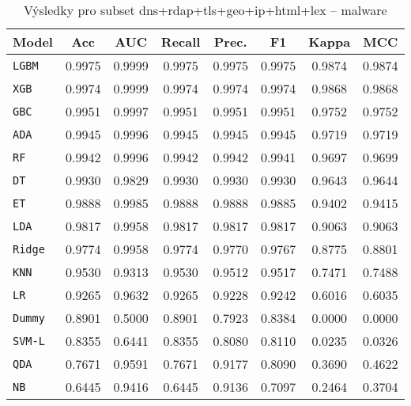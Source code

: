 \begin{table}[H]
  \centering
  \small
  \caption{Výsledky pro subset dns+rdap+tls+geo+ip+html+lex – malware}
  \begin{tabular}{|l|c|c|c|c|c|c|c|}
    \hline
    \textbf{Model} & \textbf{Acc} & \textbf{AUC} & \textbf{Recall} & \textbf{Prec.} & \textbf{F1} & \textbf{Kappa} & \textbf{MCC} \\
    \hline
    \texttt{LGBM} & 0.9975 & 0.9999 & 0.9975 & 0.9975 & 0.9975 & 0.9874 & 0.9874 \\
    \texttt{XGB} & 0.9974 & 0.9999 & 0.9974 & 0.9974 & 0.9974 & 0.9868 & 0.9868 \\
    \texttt{GBC} & 0.9951 & 0.9997 & 0.9951 & 0.9951 & 0.9951 & 0.9752 & 0.9752 \\
    \texttt{ADA} & 0.9945 & 0.9996 & 0.9945 & 0.9945 & 0.9945 & 0.9719 & 0.9719 \\
    \texttt{RF} & 0.9942 & 0.9996 & 0.9942 & 0.9942 & 0.9941 & 0.9697 & 0.9699 \\
    \texttt{DT} & 0.9930 & 0.9829 & 0.9930 & 0.9930 & 0.9930 & 0.9643 & 0.9644 \\
    \texttt{ET} & 0.9888 & 0.9985 & 0.9888 & 0.9888 & 0.9885 & 0.9402 & 0.9415 \\
    \texttt{LDA} & 0.9817 & 0.9958 & 0.9817 & 0.9817 & 0.9817 & 0.9063 & 0.9063 \\
    \texttt{Ridge} & 0.9774 & 0.9958 & 0.9774 & 0.9770 & 0.9767 & 0.8775 & 0.8801 \\
    \texttt{KNN} & 0.9530 & 0.9313 & 0.9530 & 0.9512 & 0.9517 & 0.7471 & 0.7488 \\
    \texttt{LR} & 0.9265 & 0.9632 & 0.9265 & 0.9228 & 0.9242 & 0.6016 & 0.6035 \\
    \texttt{Dummy} & 0.8901 & 0.5000 & 0.8901 & 0.7923 & 0.8384 & 0.0000 & 0.0000 \\
    \texttt{SVM-L} & 0.8355 & 0.6441 & 0.8355 & 0.8080 & 0.8110 & 0.0235 & 0.0326 \\
    \texttt{QDA} & 0.7671 & 0.9591 & 0.7671 & 0.9177 & 0.8090 & 0.3690 & 0.4622 \\
    \texttt{NB} & 0.6445 & 0.9416 & 0.6445 & 0.9136 & 0.7097 & 0.2464 & 0.3704 \\
    \hline
  \end{tabular}
\end{table}
\vspace{0.5cm}


